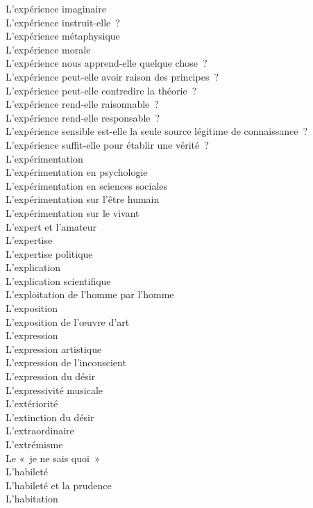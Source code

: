 \documentclass[a4paper,12pt]{article}
\begin{document}
L'expérience imaginaire \\
L'expérience instruit-elle ? \\
L'expérience métaphysique \\
L'expérience morale \\
L'expérience nous apprend-elle quelque chose ? \\
L'expérience peut-elle avoir raison des principes ? \\
L'expérience peut-elle contredire la théorie ? \\
L'expérience rend-elle raisonnable ? \\
L'expérience rend-elle responsable ? \\
L'expérience sensible est-elle la seule source légitime de connaissance ? \\
L'expérience suffit-elle pour établir une vérité ? \\
L'expérimentation \\
L'expérimentation en psychologie \\
L'expérimentation en sciences sociales \\
L'expérimentation sur l'être humain \\
L'expérimentation sur le vivant \\
L'expert et l'amateur \\
L'expertise \\
L'expertise politique \\
L'explication \\
L'explication scientifique \\
L'exploitation de l'homme par l'homme \\
L'exposition \\
L'exposition de l'œuvre d'art \\
L'expression \\
L'expression artistique \\
L'expression de l'inconscient \\
L'expression du désir \\
L'expressivité musicale \\
L'extériorité \\
L'extinction du désir \\
L'extraordinaire \\
L'extrémisme \\
Le « je ne sais quoi » \\
L'habileté \\
L'habileté et la prudence \\
L'habitation \\
\end{document}
